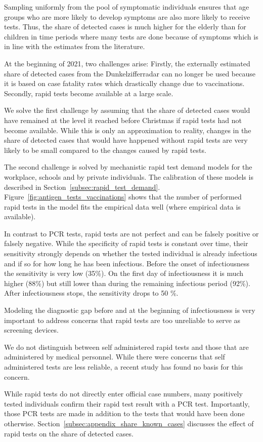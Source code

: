 Sampling uniformly from the pool of symptomatic individuals ensures that age groups who
are more likely to develop symptoms are also more likely to receive tests. Thus, the
share of detected cases is much higher for the elderly than for children in time periods
where many tests are done because of symptoms which is in line with the estimates from
the literature. %

At the beginning of 2021, two challenges arise: Firstly, the externally estimated share
of detected cases from the Dunkelzifferradar can no longer be used because it is based on
case fatality rates which drastically change due to vaccinations. Secondly, rapid tests
become available at a large scale.

We solve the first challenge by assuming that the share of detected cases would have
remained at the level it reached before Christmas if rapid tests had not become
available. While this is only an approximation to reality, changes in the share of
detected cases that would have happened without rapid tests are very likely to be small
compared to the changes caused by rapid tests.

The second challenge is solved by mechanistic rapid test demand models for the workplace,
schools and by private individuals. The calibration of these models is described in
Section~\ref{subsec:rapid_test_demand}. Figure~\ref{fig:antigen_tests_vaccinations} shows
that the number of performed rapid tests in the model fits the empirical data well (where
empirical data is available).

In contrast to PCR tests, rapid tests are not perfect and can be falsely positive or
falsely negative. While the specificity of rapid tests is constant over time, their
sensitivity strongly depends on whether the tested individual is already infectious and
if so for how long he has been infectious. Before the onset of infectiousness the
sensitivity is very low (35\%). On the first day of infectiousness it is much higher
(88\%) but still lower than during the remaining infectious period (92\%). After
infectiousness stops, the sensitivity drops to 50 \%.

Modeling the diagnostic gap before and at the beginning of infectiousness is very
important to address concerns that rapid tests are too unreliable to serve as screening
devices.

We do not distinguish between self administered rapid tests and those that are
administered by medical personnel. While there were concerns that self administered tests
are less reliable, a recent study has found no basis for this concern.

While rapid tests do not directly enter official case numbers, many positively tested
individuals confirm their rapid test result with a PCR test.
Importantly, those PCR tests are made in addition to the tests that would have been
done otherwise. Section~\ref{subsec:appendix_share_known_cases} discusses the effect
of rapid tests on the share of detected cases.
